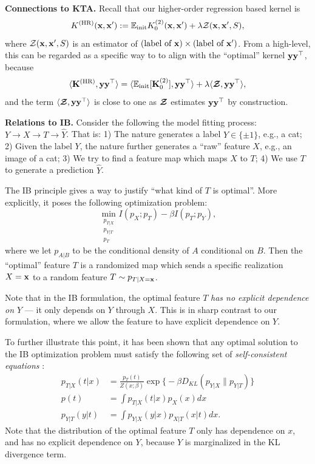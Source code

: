 {\bf Connections to KTA.} Recall that our higher-order regression based kernel is 
\begin{equation*}
	K^{(\textnormal{HR})}({\mathbf{x}}, {\mathbf{x}}') :  = {\mathbb{E}}_{\textnormal{init}} K^{(2)}_0({\mathbf{x}}, {\mathbf{x}}') + \lambda {\mathcal{Z}}({\mathbf{x}}, {\mathbf{x}}', S), 
\end{equation*}
where ${\mathcal{Z}}({\mathbf{x}}, {\mathbf{x}}', S)$ is an estimator of $(\textnormal{label of }{\mathbf{x}}) \times (\textnormal{label of }{\mathbf{x}}')$. From a high-level, this can be regarded as a specific way to to align with the ``optimal'' kernel ${\mathbf{y}} {\mathbf{y}}^\top$, because 
\[
    \langle{\mathbf{K}}^{(\textnormal{HR})}, {\mathbf{y}}{\mathbf{y}}^\top\rangle = \langle{\mathbb{E}}_{\textnormal{init}} [{\mathbf{K}}^{(2)}_0] , {\mathbf{y}}{\mathbf{y}}^\top\rangle + \lambda \langle \boldsymbol{{\mathcal{Z}}}, {\mathbf{y}}{\mathbf{y}}^\top\rangle,
\]
and the term $\langle \boldsymbol{{\mathcal{Z}}}, {\mathbf{y}}{\mathbf{y}}^\top\rangle$ is close to one as $\boldsymbol{{\mathcal{Z}}}$ estimates ${\mathbf{y}}{\mathbf{y}}^\top$ by construction.

{\bf Relations to IB.} Consider the following the model fitting process: $Y\to X \to T \to \hat Y$. That is: 1) The nature generates a label $Y \in \{\pm 1\}$, e.g., a cat; 2) Given the label $Y$, the nature further generates a ``raw'' feature $X$, e.g., an image of a cat; 3) We try to find a feature map which maps $X$ to $T$; 4) We use $T$ to generate a prediction $\hat Y$. 

The IB principle gives a way to justify ``what kind of $T$ is optimal''. More explicitly, it poses the following optimization problem:
\[
	\min_{\substack{p_{T|X}\\ p_{Y|T}\\ p_T}} I(p_X; p_T) - \beta I(p_T; p_Y),
\]
where we let $p_{A|B}$ to be the conditional density of $A$ conditional on $B$. Then the ``optimal'' feature $T$ is a randomized map which sends a specific realization $X = {\mathbf{x}}$ to a random feature $T \sim p_{T|X={\mathbf{x}}}$. 

Note that in the IB formulation, the optimal feature $T$ \emph{has no explicit dependence on $Y$} --- it only depends on $Y$ through $X$. This is in sharp contrast to our formulation, where we allow the feature to have explicit dependence on $Y$.

To further illustrate this point, it has been shown that any optimal solution to the IB optimization problem must satisfy the following set of \emph{self-consistent equations} \citep{tishby2000information}:
\begin{align*}
	p_{T|X}(t|x)& = \frac{p_T(t)}{Z(x; \beta)} \exp\bigg\{ -\beta D_{KL}(p_{Y|X} \| p_{Y|T})\bigg\}\\
	p(t) & = \int p_{T|X}(t | x) p_X(x) dx \\
	p_{Y|T}(y|t) & = \int p_{Y|X}(y|x) p_{X|T}(x|t) dx.
\end{align*}
Note that the distribution of the optimal feature $T$ only has dependence on $x$, and has no explicit dependence on $Y$, because $Y$ is marginalized in the KL divergence term.